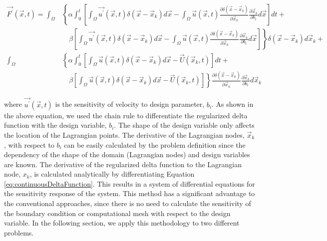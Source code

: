 \documentclass[12pt]{aiaa-pretty}
\begin{document}
%
\begin{equation}
\begin{aligned}\label{eq:forceingFunctionDerivative}
	\vec{F^\prime}(\vec{x}, t) = 
	\int_\Omega 
	&\left\{
 	\alpha \int_0^t
	\left[
	\int_\Omega \vec{u^\prime} (\vec{x}, t) \delta(\vec{x} - \vec{x}_k) d\vec{x} - 
	\int_\Omega \vec{u} (\vec{x}, t) \frac{\partial \delta(\vec{x} - \vec{x}_k)}{\partial \vec{x}_k} \frac{\partial \vec{x}_k}{\partial b_i} d\vec{x}
	\right]dt + \right. \\
	&\left.
	\quad \beta
	\left[
	\int_\Omega \vec{u^\prime} (\vec{x}, t) \delta(\vec{x} - \vec{x}_k) d\vec{x} - 
	\int_\Omega \vec{u} (\vec{x}, t) \frac{\partial \delta(\vec{x} - \vec{x}_k)}{\partial \vec{x}_k} \frac{\partial \vec{x}_k}{\partial b_i} d\vec{x}
	\right]
	\right\} \delta(\vec{x} - \vec{x}_k) d\vec{x}_k + \\
	\int_\Omega 
	&\left\{
 	\alpha \int_0^t
	\left[
	\int_\Omega \vec{u} (\vec{x}, t) \delta(\vec{x} - \vec{x}_k) d\vec{x} - \vec{U}\left( \vec{x}_k, t \right)
	\right]dt + \right. \\
	&\left.
	\quad \beta \left[
	\int_\Omega \vec{u} (\vec{x}, t) \delta(\vec{x} - \vec{x}_k) d\vec{x} - \vec{U}\left( \vec{x}_k, t \right)
	\right]
	\right\} \frac{\partial \delta(\vec{x} - \vec{x}_k)}{\partial \vec{x}_k} \frac{\partial \vec{x}_k}{\partial b_i} d\vec{x}_k
\end{aligned}
\end{equation}
%

where $\vec{u^\prime}\left( \vec{x}, t \right)$ is the sensitivity of velocity to design parameter, $b_i$. As shown in the above equation, we used the chain rule to differentiate the regularized delta function with the design variable, $b_i$. The shape of the design variable only affects the location of the Lagrangian points. The derivative of the Lagrangian nodes, $\vec{x}_k$, with respect to $b_i$ can be easily calculated by the problem definition since the dependency of the shape of the domain (Lagrangian nodes) and design variables are known. The derivative of the regularized delta function to the Lagrangian node, $x_k$, is calculated analytically by differentiating Equation \eqref{eq:continuousDeltaFunction}. This results in a system of differential equations for the sensitivity response of the system. This method has a significant advantage to the conventional approaches, since there is no need to calculate the sensitivity of the boundary condition or computational mesh with respect to the design variable. In the following section, we apply this methodology to two different problems.
\end{document}
